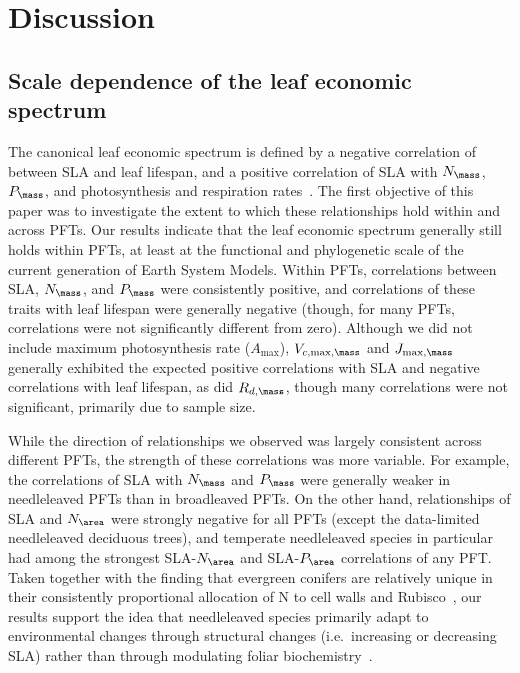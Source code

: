 \section{Discussion}

\subsection{Scale dependence of the leaf economic spectrum}

The canonical leaf economic spectrum is defined by a negative correlation of between SLA and leaf lifespan, and a positive correlation of SLA with $N_{\mass}$, $P_{\mass}$, and photosynthesis and respiration rates~\cite{wright_worldwide_2004}.
The first objective of this paper was to investigate the extent to which these relationships hold within and across PFTs.
Our results indicate that the leaf economic spectrum generally still holds within PFTs, at least at the functional and phylogenetic scale of the current generation of Earth System Models.
Within PFTs, correlations between SLA, $N_{\mass}$, and $P_{\mass}$ were consistently positive, and correlations of these traits with leaf lifespan were generally negative (though, for many PFTs, correlations were not significantly different from zero).
Although we did not include maximum photosynthesis rate ($A_{\max}$), $V_{c,\max,\mass}$ and $J_{\max,\mass}$ generally exhibited the expected positive correlations with SLA and negative correlations with leaf lifespan, as did $R_{d,\mass}$, though many correlations were not significant, primarily due to sample size.

While the direction of relationships we observed was largely consistent across different PFTs, the strength of these correlations was more variable.
For example, the correlations of SLA with $N_{\mass}$ and $P_{\mass}$ were generally weaker in needleleaved PFTs than in broadleaved PFTs.
On the other hand, relationships of SLA and $N_{\area}$ were strongly negative for all PFTs (except the data-limited needleleaved deciduous trees), and temperate needleleaved species in particular had among the strongest SLA-$N_{\area}$ and SLA-$P_{\area}$ correlations of any PFT\@.
Taken together with the finding that evergreen conifers are relatively unique in their consistently proportional allocation of N to cell walls and Rubisco~\cite{onoda_physiological_2017}, our results support the idea that needleleaved species primarily adapt to environmental changes through structural changes (i.e.\ increasing or decreasing SLA) rather than through modulating foliar biochemistry~\cite{robakowski_2004_needle}.

